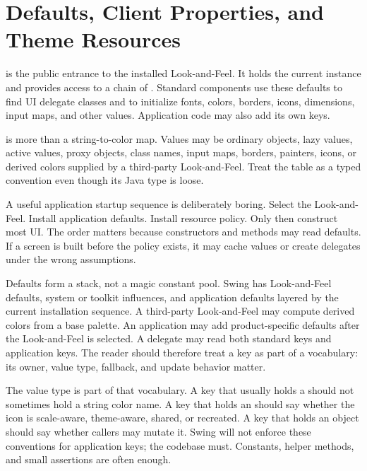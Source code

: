 \section{Defaults, Client Properties, and Theme Resources}

 is the public entrance to the installed Look-and-Feel. It holds the current  instance and provides access to a chain of . Standard components use these defaults to find UI delegate classes and to initialize fonts, colors, borders, icons, dimensions, input maps, and other values. Application code may also add its own keys.

 is more than a string-to-color map. Values may be ordinary objects, lazy values, active values, proxy objects, class names, input maps, borders, painters, icons, or derived colors supplied by a third-party Look-and-Feel. Treat the table as a typed convention even though its Java type is loose.

A useful application startup sequence is deliberately boring. Select the Look-and-Feel. Install application defaults. Install resource policy. Only then construct most UI. The order matters because constructors and  methods may read defaults. If a screen is built before the policy exists, it may cache values or create delegates under the wrong assumptions.

Defaults form a stack, not a magic constant pool. Swing has Look-and-Feel defaults, system or toolkit influences, and application defaults layered by the current installation sequence. A third-party Look-and-Feel may compute derived colors from a base palette. An application may add product-specific defaults after the Look-and-Feel is selected. A delegate may read both standard keys and application keys. The reader should therefore treat a key as part of a vocabulary: its owner, value type, fallback, and update behavior matter.

The value type is part of that vocabulary. A key that usually holds a  should not sometimes hold a string color name. A key that holds an  should say whether the icon is scale-aware, theme-aware, shared, or recreated. A key that holds an  object should say whether callers may mutate it. Swing will not enforce these conventions for application keys; the codebase must. Constants, helper methods, and small assertions are often enough.

